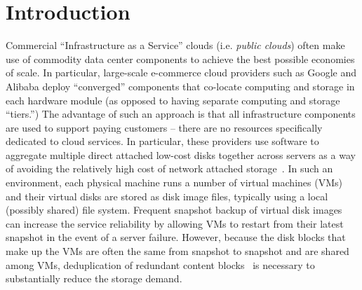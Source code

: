 \section{Introduction}

Commercial ``Infrastructure as a Service'' clouds (i.e. {\em public
clouds}) often make use of commodity data center components to achieve the
best possible economies of scale.  In particular, large-scale e-commerce cloud
providers such as Google and Alibaba deploy ``converged'' components that
co-locate computing and storage in each hardware module (as opposed to having
separate computing and storage ``tiers.'')  The advantage of such an approach
is that all infrastructure components are used to support paying customers --
there are no resources specifically dedicated to cloud services.
In particular, these providers use software to
aggregate multiple direct attached low-cost disks together across
servers as a way of avoiding the relatively high cost of network attached 
storage~\cite{googlefs03,hdfs10}.
In such an environment,
each physical machine runs a number of virtual machines (VMs)
and their virtual disks are stored as disk image files, typically
using a local (possibly shared) file system.
Frequent snapshot backup of virtual disk images can
increase the service reliability by allowing VMs to restart from their latest
snapshot in the event of a server failure.  However, because the disk
blocks that make up the VMs are often the same from snapshot to snapshot
and are shared among VMs,  
deduplication of redundant content
blocks~\cite{venti02,bottleneck08} is necessary to substantially reduce the
storage demand.

